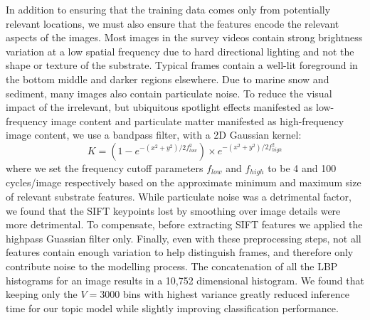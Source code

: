 In addition to ensuring that the training data comes only from potentially relevant locations, we must also ensure that the features encode the relevant aspects of the images.
Most images in the survey videos contain strong brightness variation at a low spatial frequency due to hard directional lighting and not the shape or texture of the substrate. Typical frames contain a well-lit foreground in the bottom middle and darker regions elsewhere. Due to marine snow and sediment, many images also contain particulate noise.
To reduce the visual impact of the irrelevant, but ubiquitous spotlight effects manifested as low-frequency image content and particulate matter manifested as high-frequency image content, we use a bandpass filter, with a 2D Gaussian kernel:
\begin{equation}
K = (1-e^{-(x^2+y^2)/2f_{low}^2}) \times e^{-(x^2+y^2)/2f_{high}^2}
\end{equation} 
where we set the frequency cutoff parameters $f_{low}$ and $f_{high}$ to be 4 and 100 cycles/image respectively based on the approximate minimum and maximum size of relevant substrate features. While particulate noise was a detrimental factor, we found that the SIFT keypoints lost by smoothing over image details were more detrimental. To compensate, before extracting SIFT features we applied the highpass Guassian filter only. Finally, even with these preprocessing steps, not all features contain enough variation to help distinguish frames, and therefore only contribute noise to the modelling process. The concatenation of all the LBP histograms for an image results in a 10,752 dimensional histogram. We found that keeping only the $V = 3000$ bins with highest variance greatly reduced inference time for our topic model while slightly improving classification performance.

